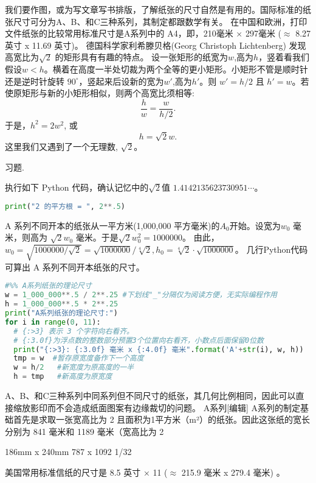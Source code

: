 \documentclass[main.tex]{subfiles}
\begin{document}
我们要作图，或为写文章写书排版，了解纸张的尺寸自然是有用的。国际标准的纸张尺寸可分为A、B、和C三种系列，其制定都跟数学有关。
在中国和欧洲，打印文件纸张的比较常用标准尺寸是A系列中的 A4，即，210毫米 × 297毫米 ($\approx$ 8.27 英寸 x 11.69 英寸)。
 德国科学家利希滕贝格(Georg Christoph Lichtenberg) 发现高宽比为$\sqrt{2}$
的矩形具有有趣的特点。
设一张矩形的纸宽为$w$,高为$h$，竖着看我们假设$w <h$。横着在高度一半处切裁为两个全等的更小矩形。小矩形不管是顺时针还是逆时针旋转 $90^\circ$，竖起来后设新的宽为$w'$,高为$h'$。则
$w' = h/2$ 且 $h' = w$。若使原矩形与新的小矩形相似，则两个高宽比须相等:
$$\frac{h}{w} = \frac{w}{h/2}.   $$
于是，$h^2= 2 w^2$, 或
 $$h= \sqrt{2} w.$$
这里我们又遇到了一个无理数, $\sqrt{2}$。
	
\begin{kaishu}习题.\end{kaishu} 执行如下 Python 代码，确认记忆中的$\sqrt{2}$值 $1.4142135623730951\cdots$。
\begin{spacing}{0.8}
	\begin{small}
	\begin{lstlisting}[language=Python]
print("2 的平方根 = ", 2**.5)
\end{lstlisting}
\end{small}
\end{spacing}

A 系列不同开本的纸张从一平方米(1,000,000 平方毫米)的$A_0$开始。设宽为$w_0$ 毫米，则高为
$\sqrt{2}w_0$ 毫米。于是$\sqrt{2}w_0^2 = 1000000$。
由此，
$w_0 = \sqrt{1000000/\sqrt{2}}=\sqrt{1000000}/\sqrt[4]{2}, 
h_0=\sqrt[4]{2}\cdot\sqrt{1000000}$。
几行Python代码可算出 A 系列不同开本纸张的尺寸。


\begin{spacing}{0.8}
	\begin{small}
	\begin{lstlisting}[language=Python]
#%% A系列纸张的理论尺寸
w = 1_000_000**.5 / 2**.25 #下划线"_"分隔仅为阅读方便，无实际编程作用
h = 1_000_000**.5 * 2**.25
print("A系列纸张的理论尺寸:")
for i in range(0, 11):
  # {:>3} 表示 3 个字符向右看齐。
  # {:3.0f}为浮点数的整数部分预置3个位置向右看齐，小数点后面保留0位数
  print("{:>3}: {:3.0f} 毫米 x {:4.0f} 毫米".format('A'+str(i), w, h))
  tmp = w  #暂存原宽度备作下一个高度
  w = h/2   #新宽度为原高度的一半
  h = tmp   #新高度为原宽度
\end{lstlisting}
\end{small}
\end{spacing}

A、B、和C三种系列中同系列但不同尺寸的纸张，其几何比例相同，因此可以直接缩放影印而不会造成纸面图案有边缘裁切的问题。
A系列[编辑]
A系列的制定基础首先是求取一张宽高比为
2
且面积为1平方米（m²）的纸张。因此这张纸的宽长分别为 841 毫米和 1189 毫米（宽高比为
2



186mm x 240mm
787 x 1092 1/32 


美国常用标准信纸的尺寸是 8.5 英寸 × 11 ($\approx$ 215.9 毫米 x 279.4 毫米) 。
\newpage
\end{document}
